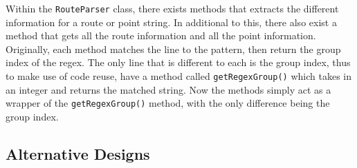 \documentclass[a4paper, 12pt, titlepage]{article}
\newcommand{\code}[1]{\small\texttt{#1}\normalsize}
\begin{document}
Within the \code{RouteParser} class, there exists methods that extracts the
different information for a route or point string. In additional to this, there
also exist a method that gets all the route information and all the point
information. Originally, each method matches the line to the pattern, then
return the group index of the regex. The only line that is different to each is
the group index, thus to make use of code reuse, have a method called
\code{getRegexGroup()} which takes in an integer and returns the matched
string. Now the methods simply act as a wrapper of the \code{getRegexGroup()}
method, with the only difference being the group index.


\subsection{Alternative Designs}
\end{document}
